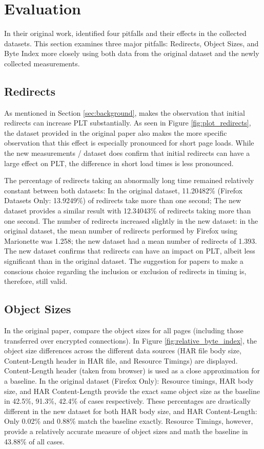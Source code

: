 \section{Evaluation}
In their original work, \citeauthor{10.1007/978-3-030-15986-3_19} identified four pitfalls and their effects in the collected datasets. This section examines three major pitfalls: Redirects, Object Sizes, and Byte Index more closely using both data from the original dataset and the newly collected measurements. 

\subsection{Redirects}
As mentioned in Section \ref{sec:background}, \citeauthor{10.1007/978-3-030-15986-3_19} makes the observation that initial redirects can increase PLT substantially. As seen in Figure \ref{fig:plot_redirects}, the dataset provided in the original paper also makes the more specific observation that this effect is especially pronounced for short page loads. While the new measurements / dataset does confirm that initial redirects can have a large effect on PLT, the difference in short load times is less pronounced. 

The percentage of redirects taking an abnormally long time remained relatively constant between both datasets: In the original dataset, 11.20482\% (Firefox Datasets Only: 13.9249\%) of redirects take more than one second; The new dataset provides a similar result with 12.34043\% of redirects taking more than one second. The number of redirects increased slightly in the new dataset: in the original dataset, the mean number of redirects performed by Firefox using Marionette was 1.258; the new dataset had a mean number of redirects of 1.393. The new dataset confirms that redirects can have an impact on PLT, albeit less significant than in the original dataset. The suggestion for papers to make a conscious choice regarding the inclusion or exclusion of redirects in timing is, therefore, still valid.

\subsection{Object Sizes}
In the original paper, \citeauthor{10.1007/978-3-030-15986-3_19} compare the object sizes for all pages (including those transferred over encrypted connections). In Figure \ref{fig:relative_byte_index}, the object size differences across the different data sources (HAR file body size, Content-Length header in HAR file, and Resource Timings) are displayed. Content-Length header (taken from browser) is used as a close approximation for a baseline. In the original dataset (Firefox Only): Resource timings, HAR body size, and HAR Content-Length provide the exact same object size as the baseline in 42.5\%, 91.3\%, 42.4\% of cases respectively. These percentages are drastically different in the new dataset for both HAR body size, and HAR Content-Length: Only 0.02\% and 0.88\% match the baseline exactly. Resource Timings, however, provide a relatively accurate measure of object sizes and math the baseline in 43.88\% of all cases.

